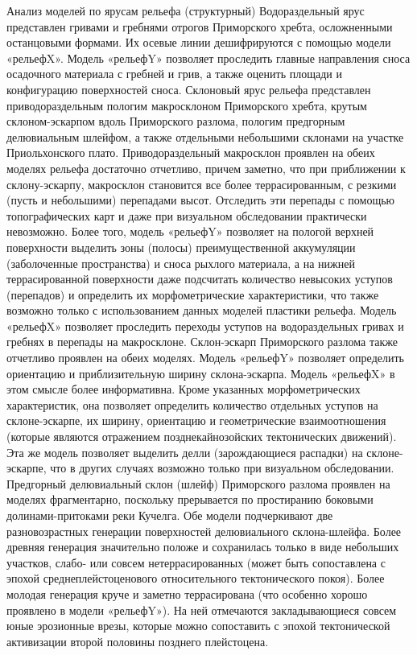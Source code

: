 \documentclass[runningheads]{AIIT}
\begin{document}
Анализ моделей по ярусам рельефа (структурный)
Водораздельный ярус представлен гривами и гребнями отрогов Приморского хребта, осложненными останцовыми формами. Их осевые линии дешифрируются с помощью модели «рельефX». Модель «рельефY» позволяет проследить главные направления сноса осадочного материала с гребней и грив, а также оценить площади и конфигурацию поверхностей сноса.
Склоновый ярус рельефа представлен приводораздельным пологим макросклоном Приморского хребта, крутым склоном-эскарпом вдоль Приморского разлома, пологим предгорным делювиальным шлейфом, а также отдельными небольшими склонами на участке Приольхонского плато.
Приводораздельный макросклон проявлен на обеих моделях рельефа достаточно отчетливо, причем заметно, что при приближении к склону-эскарпу, макросклон становится все более террасированным, с резкими (пусть и небольшими) перепадами высот. Отследить эти перепады с помощью топографических карт и даже при визуальном обследовании практически невозможно. Более того, модель «рельефY» позволяет на пологой верхней поверхности выделить зоны (полосы) преимущественной аккумуляции (заболоченные пространства) и сноса рыхлого материала, а на нижней террасированной поверхности даже подсчитать количество невысоких уступов (перепадов) и определить их морфометрические характеристики, что также возможно только с использованием данных моделей пластики рельефа. Модель «рельефX» позволяет проследить переходы уступов на водораздельных гривах и гребнях в перепады на макросклоне.
Склон-эскарп Приморского разлома также отчетливо проявлен на обеих моделях. Модель «рельефY» позволяет определить ориентацию и приблизительную ширину склона-эскарпа. Модель «рельефX» в этом смысле более информативна. Кроме указанных морфометрических характеристик, она позволяет определить количество отдельных уступов на склоне-эскарпе, их ширину, ориентацию и геометрические взаимоотношения (которые являются отражением позднекайнозойских тектонических движений). Эта же модель позволяет выделить делли (зарождающиеся распадки) на склоне-эскарпе, что в других случаях возможно только при визуальном обследовании.
Предгорный делювиальный склон (шлейф) Приморского разлома проявлен на моделях фрагментарно, поскольку прерывается по простиранию боковыми долинами-притоками реки Кучелга. Обе модели подчеркивают две разновозрастных генерации поверхностей делювиального склона-шлейфа. Более древняя генерация значительно положе и сохранилась только в виде небольших участков, слабо- или совсем нетеррасированных (может быть сопоставлена с эпохой среднеплейстоценового относительного тектонического покоя). Более молодая генерация круче и заметно террасирована (что особенно хорошо проявлено в модели «рельефY»). На ней отмечаются закладывающиеся совсем юные эрозионные врезы, которые можно сопоставить с эпохой тектонической активизации второй половины позднего плейстоцена.
\end{document}
